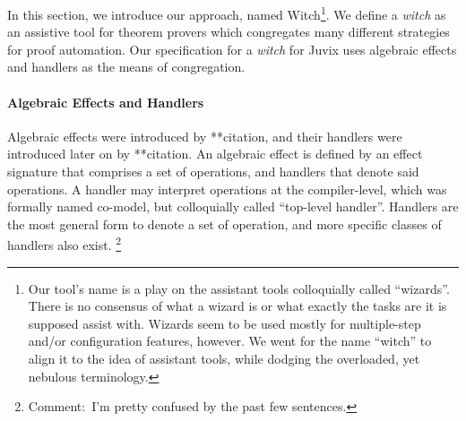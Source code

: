 \documentclass[sigconfl]{acmart}
\newcommand{\comment}[1]{\footnote{Comment:~#1}}
\begin{document}
In this section, we introduce our approach, named Witch\footnote{Our tool's name is
  a play on the assistant tools colloquially called ``wizards''. There is no
  consensus of what a wizard is or what exactly the tasks are it is supposed
  assist with. Wizards seem to be used mostly for multiple-step and/or
  configuration features, however. We went for the name ``witch'' to align it to
  the idea of assistant tools, while dodging the overloaded, yet nebulous
  terminology.}. We define a \textit{witch} as an assistive tool for theorem
provers which congregates many different strategies for proof automation. Our
specification for a \textit{witch} for Juvix uses algebraic effects and handlers
as the means of congregation.

\paragraph{Algebraic Effects and Handlers} Algebraic effects were introduced by
**citation, and their handlers were introduced later on by **citation. An
algebraic effect is defined by an effect signature that comprises a set of
operations, and handlers that denote said operations. A handler may interpret
operations at the compiler-level, which was formally named co-model, but
colloquially called ``top-level handler''. Handlers are the most general form to
denote a set of operation, and more specific classes of handlers also exist.
\comment{I'm pretty confused by the past few sentences.}
\end{document}
